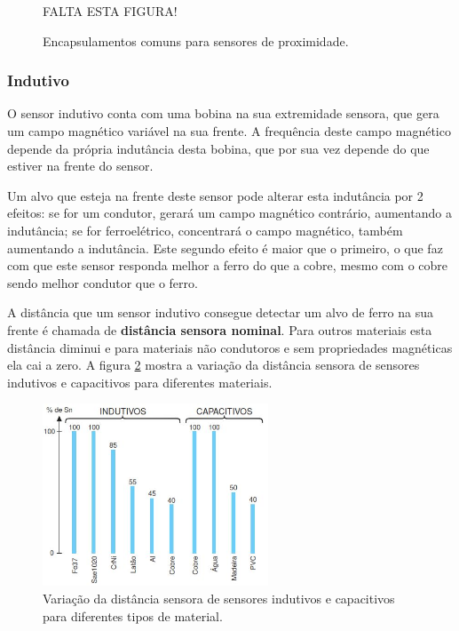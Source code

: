 \begin{figure}
  \centering
  {\Huge FALTA ESTA FIGURA!}%
  \caption{Encapsulamentos comuns para sensores de proximidade.}\label{fig:proximidade}
\end{figure}

\subsubsection{Indutivo}
\label{subs:Indutivo}
O sensor indutivo conta com uma bobina na sua extremidade sensora, que gera um campo magnético variável na sua frente. A frequência deste campo magnético depende da própria indutância desta bobina, que por sua vez depende do que estiver na frente do sensor.

Um alvo que esteja na frente deste sensor pode alterar esta indutância por 2 efeitos: se for um condutor, gerará um campo magnético contrário, aumentando a indutância; se for ferroelétrico, concentrará o campo magnético, também aumentando a indutância. Este segundo efeito é maior que o primeiro, o que faz com que este sensor responda melhor a ferro do que a cobre, mesmo com o cobre sendo melhor condutor que o ferro.

A distância que um sensor indutivo consegue detectar um alvo de ferro na sua frente é chamada de \textbf{distância sensora nominal}. Para outros materiais esta distância diminui e para materiais não condutoros e sem propriedades magnéticas ela cai a zero. A figura \ref{fig:distancia_sensora} mostra a variação da distância sensora de sensores indutivos e capacitivos para diferentes materiais.

\begin{figure}
  \centering
  \includegraphics[width=0.6\textwidth]{figuras/distancia_sensora}
  \caption{Variação da distância sensora de sensores indutivos e capacitivos para diferentes tipos de material.}\label{fig:distancia_sensora}
\end{figure}

